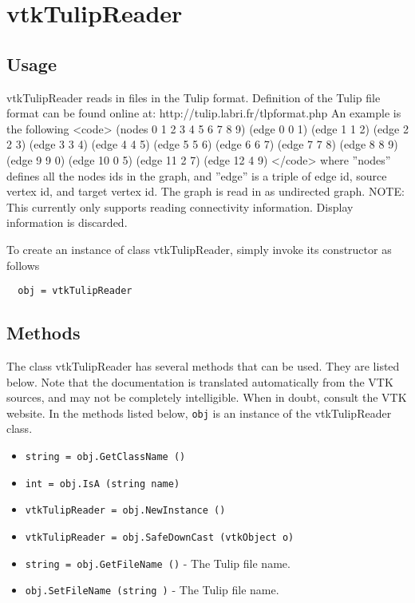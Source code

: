 \section{vtkTulipReader}

\subsection{Usage}

 vtkTulipReader reads in files in the Tulip format.
 Definition of the Tulip file format can be found online at:
 http://tulip.labri.fr/tlpformat.php
 An example is the following
 <code>
 (nodes 0 1 2 3 4 5 6 7 8 9)
 (edge 0 0 1)
 (edge 1 1 2)
 (edge 2 2 3)
 (edge 3 3 4)
 (edge 4 4 5)
 (edge 5 5 6)
 (edge 6 6 7)
 (edge 7 7 8)
 (edge 8 8 9)
 (edge 9 9 0)
 (edge 10 0 5)
 (edge 11 2 7)
 (edge 12 4 9)
 </code>
 where ''nodes'' defines all the nodes ids in the graph, and ''edge''
 is a triple of edge id, source vertex id, and target vertex id.
 The graph is read in as undirected graph.
 NOTE: This currently only supports reading connectivity information.
 Display information is discarded.

To create an instance of class vtkTulipReader, simply
invoke its constructor as follows
\begin{verbatim}
  obj = vtkTulipReader
\end{verbatim}
\subsection{Methods}

The class vtkTulipReader has several methods that can be used.
  They are listed below.
Note that the documentation is translated automatically from the VTK sources,
and may not be completely intelligible.  When in doubt, consult the VTK website.
In the methods listed below, \verb|obj| is an instance of the vtkTulipReader class.
\begin{itemize}
\item  \verb|string = obj.GetClassName ()|

\item  \verb|int = obj.IsA (string name)|

\item  \verb|vtkTulipReader = obj.NewInstance ()|

\item  \verb|vtkTulipReader = obj.SafeDownCast (vtkObject o)|

\item  \verb|string = obj.GetFileName ()| -  The Tulip file name.

\item  \verb|obj.SetFileName (string )| -  The Tulip file name.

\end{itemize}

